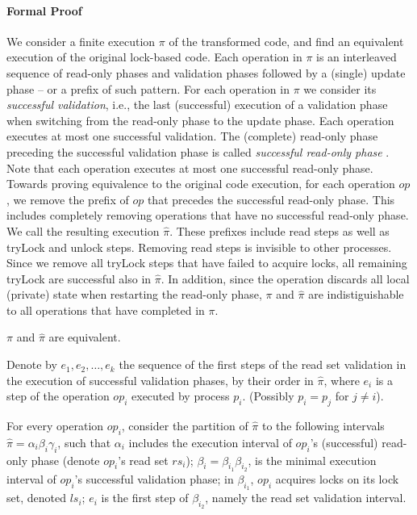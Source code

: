 \paragraph{Formal Proof}
We consider a finite execution $\pi$ of the transformed
code, and find an equivalent execution of the original lock-based
code.
Each operation in $\pi$ is an interleaved sequence of read-only phases and validation phases followed by a (single) update phase -- or a prefix of such pattern.
For each operation in $\pi$ we consider its \emph{successful validation}, i.e.,
the last (successful) execution of a validation phase when switching from the read-only
phase to the update phase. Each operation executes at most one successful 
validation. The (complete) read-only phase preceding the successful
validation phase is called \emph{successful read-only
phase} .
Note that each operation executes at most one successful read-only
phase.
Towards proving equivalence to the original code execution, for each operation $op$, we remove the prefix of $op$ that precedes the successful read-only phase.
This includes completely removing operations that have no successful read-only phase.
We call the resulting execution $\hat{\pi}$.
These prefixes include read steps as well as tryLock and
unlock steps.
Removing read steps is invisible to other processes. Since we remove all tryLock steps that have failed to acquire locks, 
all remaining tryLock are successful also in $\hat{\pi}$. In addition, since the operation discards all local (private) state when restarting the read-only phase, $\pi$ and $\hat{\pi}$ are indistiguishable to all operations that have completed in $\pi$.
\begin{claim}
\label{claim:pipihat}
$\pi$ and $\hat{\pi}$ are equivalent.
\end{claim}

Denote by $e_1, e_2, \ldots, e_k$ the sequence of the first steps of
the read set validation in the execution of successful validation
phases, by their order in $\hat{\pi}$, where $e_i$ is a step of the operation $op_{i}$ executed by process $p_{i}$.
(Possibly $p_i=p_j$ for $j \neq i$).

For every operation $op_{i}$, consider the partition of $\hat{\pi}$ to
the following intervals $\hat{\pi}=\alpha_i\beta_i\gamma_i$, such that
$\alpha_i$ includes the execution interval of $op_{i}$'s (successful) read-only phase
(denote $op_{i}$'s read set $rs_{i}$); $\beta_i=\beta_{i_1}\beta_{i_2}$, is the
minimal execution interval of $op_{i}$'s successful validation phase;
in $\beta_{i_1}$, $op_{i}$ acquires 
locks on its lock set, denoted $ls_{i}$; 
$e_i$ is the first step of $\beta_{i_2}$, namely the read set validation
interval.


